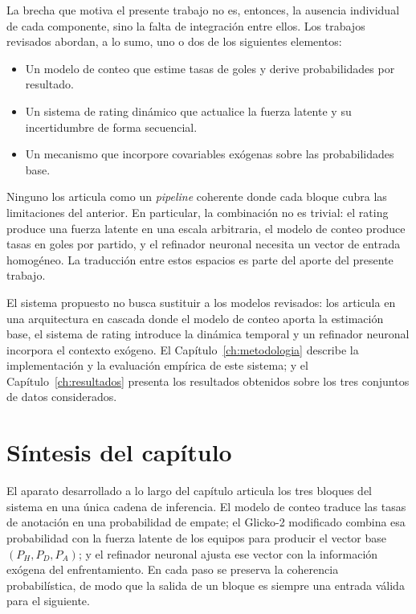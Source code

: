 La brecha que motiva el presente trabajo no es, entonces, la ausencia individual de cada componente, sino la falta de integraci\'on entre ellos. Los trabajos revisados abordan, a lo sumo, uno o dos de los siguientes elementos:

\begin{itemize}
	\item Un modelo de conteo que estime tasas de goles y derive probabilidades por resultado.
	\item Un sistema de rating din\'amico que actualice la fuerza latente y su incertidumbre de forma secuencial.
	\item Un mecanismo que incorpore covariables ex\'ogenas sobre las probabilidades base.
\end{itemize}

Ninguno los articula como un \textit{pipeline} coherente donde cada bloque cubra las limitaciones del anterior. En particular, la combinaci\'on no es trivial: el rating produce una fuerza latente en una escala arbitraria, el modelo de conteo produce tasas en goles por partido, y el refinador neuronal necesita un vector de entrada homog\'eneo. La traducci\'on entre estos espacios es parte del aporte del presente trabajo.

El sistema propuesto no busca sustituir a los modelos revisados: los articula en una arquitectura en cascada donde el modelo de conteo aporta la estimaci\'on base, el sistema de rating introduce la din\'amica temporal y un refinador neuronal incorpora el contexto ex\'ogeno. El Cap\'itulo~\ref{ch:metodologia} describe la implementaci\'on y la evaluaci\'on emp\'irica de este sistema; y el Cap\'itulo~\ref{ch:resultados} presenta los resultados obtenidos sobre los tres conjuntos de datos considerados.

\section*{S\'intesis del cap\'itulo}

El aparato desarrollado a lo largo del cap\'itulo articula los tres bloques del sistema en una \'unica cadena de inferencia. El modelo de conteo traduce las tasas de anotaci\'on en una probabilidad de empate; el Glicko-2 modificado combina esa probabilidad con la fuerza latente de los equipos para producir el vector base $(P_H, P_D, P_A)$; y el refinador neuronal ajusta ese vector con la informaci\'on ex\'ogena del enfrentamiento. En cada paso se preserva la coherencia probabil\'istica, de modo que la salida de un bloque es siempre una entrada v\'alida para el siguiente.

